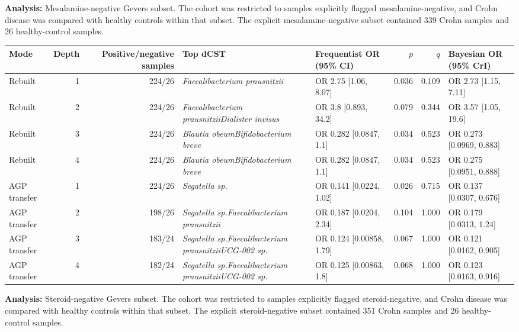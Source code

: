 \noindent\textbf{Analysis:} Mesalamine-negative Gevers subset. The cohort was restricted to samples explicitly flagged mesalamine-negative, and Crohn disease was compared with healthy controls within that subset. The explicit mesalamine-negative subset contained 339 Crohn samples and 26 healthy-control samples.

\begin{center}
\scriptsize
\begin{tabularx}{\textwidth}{@{} l r r Y Y r r Y @{}}
\toprule
Mode & Depth & Positive/negative samples & Top dCST & Frequentist OR (95\% CI) & \(p\) & \(q\) & Bayesian OR (95\% CrI) \\
\midrule
Rebuilt & 1 & 224/26 & \emph{Faecalibacterium prausnitzii} & OR 2.75 [1.06, 8.07] & 0.036 & 0.109 & OR 2.73 [1.15, 7.11] \\
Rebuilt & 2 & 224/26 & \emph{Faecalibacterium prausnitzii}\dcstsep \emph{Dialister invisus} & OR 3.8 [0.893, 34.2] & 0.079 & 0.344 & OR 3.57 [1.05, 19.6] \\
Rebuilt & 3 & 224/26 & \emph{Blautia obeum}\dcstsep \emph{Bifidobacterium breve} & OR 0.282 [0.0847, 1.1] & 0.034 & 0.523 & OR 0.273 [0.0969, 0.883] \\
Rebuilt & 4 & 224/26 & \emph{Blautia obeum}\dcstsep \emph{Bifidobacterium breve} & OR 0.282 [0.0847, 1.1] & 0.034 & 0.523 & OR 0.275 [0.0951, 0.888] \\
AGP transfer & 1 & 224/26 & \emph{Segatella sp.} & OR 0.141 [0.0224, 1.02] & 0.026 & 0.715 & OR 0.137 [0.0307, 0.676] \\
AGP transfer & 2 & 198/26 & \emph{Segatella sp.}\dcstsep \emph{Faecalibacterium prausnitzii} & OR 0.187 [0.0204, 2.34] & 0.104 & 1.000 & OR 0.179 [0.0313, 1.24] \\
AGP transfer & 3 & 183/24 & \emph{Segatella sp.}\dcstsep \emph{Faecalibacterium prausnitzii}\dcstsep \emph{UCG-002 sp.} & OR 0.124 [0.00858, 1.79] & 0.067 & 1.000 & OR 0.121 [0.0162, 0.905] \\
AGP transfer & 4 & 182/24 & \emph{Segatella sp.}\dcstsep \emph{Faecalibacterium prausnitzii}\dcstsep \emph{UCG-002 sp.} & OR 0.125 [0.00863, 1.8] & 0.068 & 1.000 & OR 0.123 [0.0163, 0.916] \\
\bottomrule
\end{tabularx}
\end{center}
\bigskip

\noindent\textbf{Analysis:} Steroid-negative Gevers subset. The cohort was restricted to samples explicitly flagged steroid-negative, and Crohn disease was compared with healthy controls within that subset. The explicit steroid-negative subset contained 351 Crohn samples and 26 healthy-control samples.

